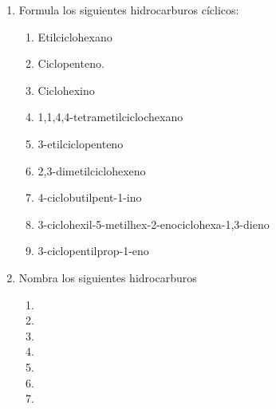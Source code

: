 \begin{enumerate}
    \item Formula los siguientes hidrocarburos cíclicos:
          \begin{enumerate}
              \item Etilciclohexano
              \item Ciclopenteno.
              \item Ciclohexino
              \item 1,1,4,4-tetrametilciclochexano
              \item 3-etilciclopenteno
              \item 2,3-dimetilciclohexeno
              \item 4-ciclobutilpent-1-ino
              \item 3-ciclohexil-5-metilhex-2-enociclohexa-1,3-dieno
              \item 3-ciclopentilprop-1-eno
          \end{enumerate}
    \item Nombra los siguientes hidrocarburos
          \begin{enumerate}
              \item {}
              \item {}
              \item {}
              \item {}
              \item {}
              \item {}
              \item  {}
          \end{enumerate}
\end{enumerate}

